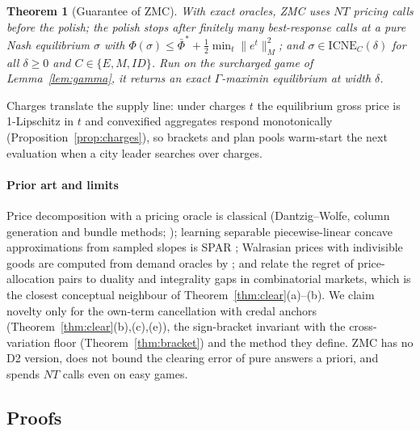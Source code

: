 \documentclass[preprint,12pt]{elsarticle}
\newtheorem{theorem}{Theorem}
\theoremstyle{definition}
\theoremstyle{remark}
\newcommand{\ICNE}{\mathrm{ICNE}}
\begin{document}
\begin{theorem}[Guarantee of ZMC]\label{thm:zmc}
With exact oracles, ZMC uses $NT$ pricing calls before the polish; the polish stops after finitely many best-response calls at a pure Nash equilibrium $\sigma$ with $\Phi(\sigma)\le\bar\Phi^*+\tfrac12\min_t\|e^t\|_M^2$; and $\sigma\in\ICNE_C(\delta)$ for all $\delta\ge0$ and $C\in\{E,M,ID\}$. Run on the surcharged game of Lemma~\ref{lem:gamma}, it returns an exact $\Gamma$-maximin equilibrium at width $\delta$.
\end{theorem}

Charges translate the supply line: under charges $t$ the equilibrium gross price is 1-Lipschitz in $t$ and convexified aggregates respond monotonically (Proposition~\ref{prop:charges}), so brackets and plan pools warm-start the next evaluation when a city leader searches over charges.

\paragraph{Prior art and limits} Price decomposition with a pricing oracle is classical (Dantzig--Wolfe, column generation and bundle methods; \citealp{Briant2008}); learning separable piecewise-linear concave approximations from sampled slopes is SPAR \citep{Powell2004}; Walrasian prices with indivisible goods are computed from demand oracles by \citet{PaesLeme2020}; and \citet{Duguet2025} relate the regret of price-allocation pairs to duality and integrality gaps in combinatorial markets, which is the closest conceptual neighbour of Theorem~\ref{thm:clear}(a)--(b). We claim novelty only for the own-term cancellation with credal anchors (Theorem~\ref{thm:clear}(b),(c),(e)), the sign-bracket invariant with the cross-variation floor (Theorem~\ref{thm:bracket}) and the method they define. ZMC has no D2 version, does not bound the clearing error of pure answers a priori, and spends $NT$ calls even on easy games.

\subsection*{Proofs}
\end{document}
